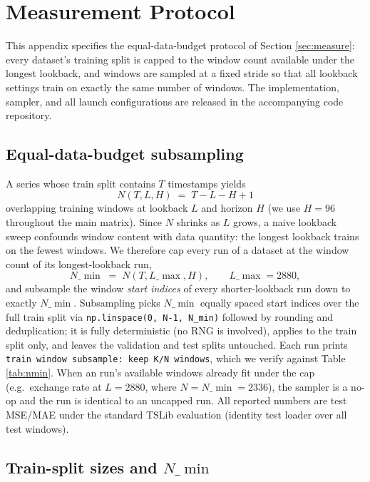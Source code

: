 \section{Measurement Protocol}
\label{app:protocol}

This appendix specifies the equal-data-budget protocol of Section \ref{sec:measure}: every dataset's training split is capped to the window count available under the longest lookback, and windows are sampled at a fixed stride so that all lookback settings train on exactly the same number of windows. The implementation, sampler, and all launch configurations are released in the accompanying code repository.

\subsection{Equal-data-budget subsampling}

A series whose train split contains $T$ timestamps yields
\begin{equation}
N(T, L, H) \;=\; T - L - H + 1
\end{equation}
overlapping training windows at lookback $L$ and horizon $H$ (we use $H{=}96$ throughout the main matrix). Since $N$ shrinks as $L$ grows, a naive lookback sweep confounds window content with data quantity: the longest lookback trains on the fewest windows. We therefore cap every run of a dataset at the window count of its longest-lookback run,
\begin{equation}
N\_{\min} \;=\; N(T, L\_{\max}, H), \qquad L\_{\max} = 2880,
\end{equation}
and subsample the window \emph{start indices} of every shorter-lookback run down to exactly $N\_{\min}$. Subsampling picks $N\_{\min}$ equally spaced start indices over the full train split via \texttt{np.linspace(0, N-1, N\_min)} followed by rounding and deduplication; it is fully deterministic (no RNG is involved), applies to the train split only, and leaves the validation and test splits untouched. Each run prints \texttt{train window subsample: keep K/N windows}, which we verify against Table \ref{tab:nmin}. When an run's available windows already fit under the cap (e.g.\ exchange rate at $L{=}2880$, where $N = N\_{\min} = 2336$), the sampler is a no-op and the run is identical to an uncapped run. All reported numbers are test MSE/MAE under the standard TSLib evaluation (identity test loader over all test windows).

\subsection{Train-split sizes and \texorpdfstring{$N\_{\min}$}{N min}}

